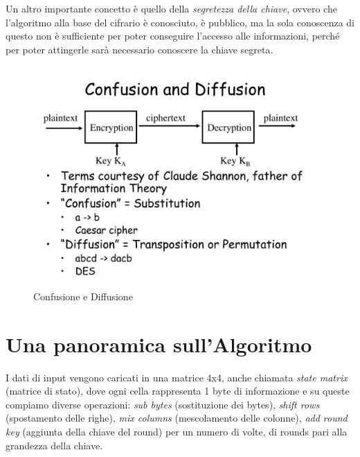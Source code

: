 
\textsf{\small Un altro importante concetto è quello della \emph{segretezza della chiave}, ovvero che l'algoritmo alla base del cifrario è conosciuto, è pubblico, ma la sola conoscenza di questo non è sufficiente per poter conseguire l'accesso alle informazioni, perché per poter attingerle sarà necessario conoscere la chiave segreta.} %

\begin{figure}[H]
	\centering
	\includegraphics[width=1\textwidth, height=1\textheight, keepaspectratio]{./images/theory_of_information/confusion-and-diffusion.png}
	\caption{Confusione e Diffusione}
	\label{fig:confusion_and_diffusion}
\end{figure}


\section{Una panoramica sull'Algoritmo}


     

\textsf{\small I dati di input vengono caricati in una matrice 4x4, anche chiamata \emph{state matrix} (matrice di stato), dove ogni cella rappresenta 1 byte di informazione e su queste compiamo diverse operazioni: \emph{sub bytes} (sostituzione dei bytes), \emph{shift rows} (spostamento delle righe), \emph{mix columns} (mescolamento delle colonne), \emph{add round key} (aggiunta della chiave del round) per un numero di volte, di rounds pari alla grandezza della chiave.} %

